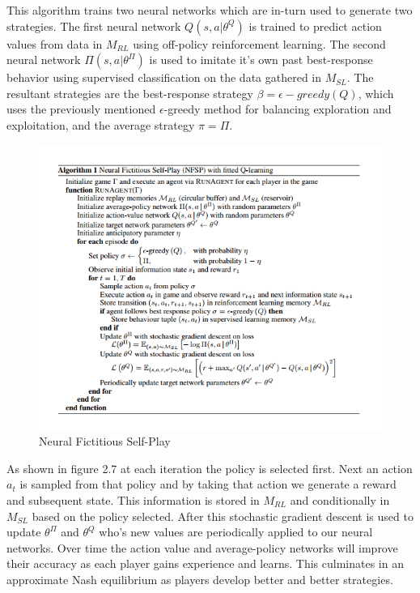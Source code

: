 This algorithm trains two neural networks which are in-turn used to generate two strategies.
The first neural network $Q(s,a|\theta^{Q})$ is trained to predict action values from data
in $M_{RL}$ using off-policy reinforcement learning.
The second neural network $\Pi(s, a | \theta^\Pi)$ is used to imitate it's own past best-response behavior
using supervised classification on the data gathered in $M_{SL}$.
The resultant strategies are the best-response strategy $\beta=\epsilon-greedy(Q)$, which
uses the previously mentioned $\epsilon$-greedy method for balancing exploration and exploitation,
and the average strategy $\pi=\Pi$.

\begin{figure}[!ht]
    \includegraphics[scale=.8]{images/NFSP_algorithm.png}
    \caption{Neural Fictitious Self-Play\citep{heinrich2016deep}}
\end{figure}

As shown in figure 2.7 at each iteration the policy is selected first.
Next an action $a_t$ is sampled from that policy and by taking that action we generate a reward
and subsequent state.
This information is stored in $M_{RL}$ and conditionally in $M_{SL}$ based on the policy selected.
After this stochastic gradient descent is used to update $\theta^\Pi$ and $\theta^Q$ who's new values
are periodically applied to our neural networks.
Over time the action value and average-policy networks will improve their
accuracy as each player gains experience and learns.
This culminates in an approximate Nash equilibrium as players develop better and better strategies.


